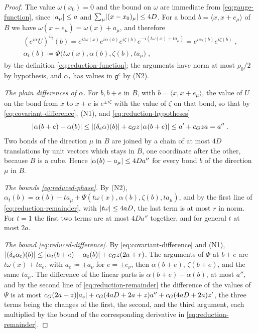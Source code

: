 \begin{proof}
The value $\omega(x_0) = 0$ and the bound on $\omega$ are immediate from \eqref{eq:gauge-function}, since $\lvert a_\mu\rvert \leq a$ and $\sum_\mu\lvert(x - x_0)_\mu\rvert \leq 4D$. For a bond $b = \langle x, x + e_\mu\rangle$ of $B$ we have $\omega(x + e_\mu) = \omega(x) + a_\mu$, and therefore
\begin{gather*}
    (e^{i\alpha}U)^{u_t}(b) = e^{it\omega(x)}e^{i\alpha(b)}e^{i\zeta(b)}e^{-i(t\omega(x) + ta_\mu)} = e^{i\alpha_t(b)}e^{i\zeta(b)}\;,\\
    \alpha_t(b) \coloneqq \Phi\bigl(t\omega(x), \alpha(b), \zeta(b), ta_\mu\bigr)\;,
\end{gather*}
by the definition \eqref{eq:reduction-function}; the arguments have norm at most $\rho_0/2$ by hypothesis, and $\alpha_t$ has values in $\mathfrak g^c$ by (N2).

\emph{The plain differences of $\alpha$.} For $b, b + e$ in $B$, with $b = \langle x, x + e_\mu\rangle$, the value of $U$ on the bond from $x$ to $x + e$ is $e^{\pm i\zeta}$ with the value of $\zeta$ on that bond, so that by \eqref{eq:covariant-difference}, (N1), and \eqref{eq:reduction-hypotheses}
\[
    \lvert\alpha(b + e) - \alpha(b)\rvert \leq \lvert(\delta_e\alpha)(b)\rvert + c_Gz\,\lvert\alpha(b + e)\rvert \leq a' + c_Gza = a''\;.
\]
Two bonds of the direction $\mu$ in $B$ are joined by a chain of at most $4D$ translations by unit vectors which stays in $B$, one coordinate after the other, because $B$ is a cube. Hence $\lvert\alpha(b) - a_\mu\rvert \leq 4Da''$ for every bond $b$ of the direction $\mu$ in $B$.

\emph{The bounds \eqref{eq:reduced-phase}.} By (N2), $\alpha_t(b) = \alpha(b) - ta_\mu + \Psi(t\omega(x), \alpha(b), \zeta(b), ta_\mu)$, and by the first line of \eqref{eq:reduction-remainder}, with $\lvert t\omega\rvert \leq 4aD$, the last term is at most $r$ in norm. For $t = 1$ the first two terms are at most $4Da''$ together, and for general $t$ at most $2a$.

\emph{The bound \eqref{eq:reduced-difference}.} By \eqref{eq:covariant-difference} and (N1), $\lvert(\delta_e\alpha_t)(b)\rvert \leq \lvert\alpha_t(b + e) - \alpha_t(b)\rvert + c_Gz(2a + r)$. The arguments of $\Phi$ at $b + e$ are $t\omega(x) + ta_e$, with $a_e \coloneqq \pm a_\nu$ for $e = \pm e_\nu$, then $\alpha(b + e)$, $\zeta(b + e)$, and the same $ta_\mu$. The difference of the linear parts is $\alpha(b + e) - \alpha(b)$, at most $a''$, and by the second line of \eqref{eq:reduction-remainder} the difference of the values of $\Psi$ is at most $c_G(2a + z)\lvert a_e\rvert + c_G(4aD + 2a + z)a'' + c_G(4aD + 2a)z'$, the three terms being the changes of the first, the second, and the third argument, each multiplied by the bound of the corresponding derivative in \eqref{eq:reduction-remainder}.
\end{proof}

